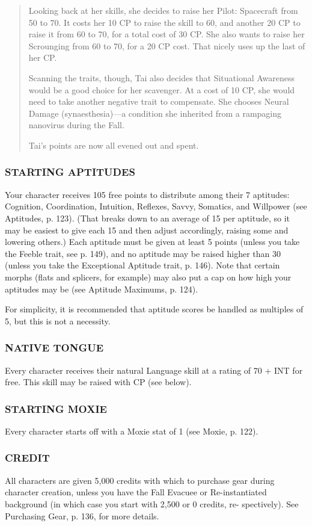\begin{quotation}
Looking back at her skills, she decides to raise her Pilot: Spacecraft from 50
to 70. It costs her 10 CP to raise the skill to 60, and another 20 CP to raise
it from 60 to 70, for a total cost of 30 CP. She also wants to raise her
Scrounging from 60 to 70, for a 20 CP cost.  That nicely uses up the last of
her CP.

Scanning the traits, though, Tai also decides that Situational Awareness would
be a good choice for her scavenger. At a cost of 10 CP, she would need to take
another negative trait to compensate. She chooses Neural Damage
(synaesthesia)—a condition she inherited from a rampaging nanovirus during the
Fall.

Tai’s points are now all evened out and spent.
\end{quotation}


\subsubsection{STARTING APTITUDES}
Your character receives 105 free points to distribute among their 7 aptitudes:
Cognition, Coordination, Intuition, Reflexes, Savvy, Somatics, and Willpower
(see Aptitudes, p. 123). (That breaks down to an average of 15 per aptitude,
so it may be easiest to give each 15 and then adjust accordingly, raising some
and lowering others.) Each aptitude must be given at least 5 points (unless you
take the Feeble trait, see p. 149), and no aptitude may be raised higher than
30 (unless you take the Exceptional Aptitude trait, p. 146). Note that certain
morphs (flats and splicers, for example) may also put a cap on how high your
aptitudes may be (see Aptitude Maximums, p. 124).

For simplicity, it is recommended that aptitude scores be handled as multiples
of 5, but this is not a necessity.

\subsubsection{NATIVE TONGUE}
Every character receives their natural Language skill at a rating of 70 + INT
for free. This skill may be raised with CP (see below).

\subsubsection{STARTING MOXIE}
Every character starts off with a Moxie stat of 1 (see Moxie, p. 122).

\subsubsection{CREDIT}
All characters are given 5,000 credits with which to purchase gear during
character creation, unless you have the Fall Evacuee or Re-instantiated
background (in which case you start with 2,500 or 0 credits, re-
spectively). See Purchasing Gear, p. 136, for more details.

